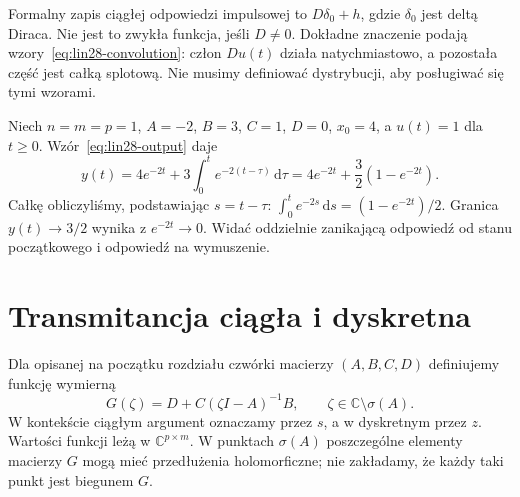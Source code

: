 \begin{uwaga}
\label{rem:lin28-dirac}
Formalny zapis ciągłej odpowiedzi impulsowej
to \(D\delta_0+h\), gdzie \(\delta_0\)
jest deltą Diraca. Nie jest to zwykła funkcja,
jeśli \(D\ne0\). Dokładne znaczenie podają
wzory~\eqref{eq:lin28-convolution}:
człon \(Du(t)\) działa natychmiastowo,
a pozostała część jest całką splotową.
Nie musimy definiować dystrybucji,
aby posługiwać się tymi wzorami.
\end{uwaga}

\begin{przyklad}
\label{prz:lin28-step}
Niech \(n=m=p=1\), \(A=-2\), \(B=3\), \(C=1\),
\(D=0\), \(x_0=4\), a \(u(t)=1\) dla \(t\ge0\).
Wzór~\eqref{eq:lin28-output} daje
\[
 y(t)=4e^{-2t}+3\int_0^t e^{-2(t-\tau)}
 \,\mathrm d\tau
 =4e^{-2t}+\frac32(1-e^{-2t}).
\]
Całkę obliczyliśmy, podstawiając \(s=t-\tau\):
\(\int_0^t e^{-2s}\,\mathrm ds=(1-e^{-2t})/2\).
Granica \(y(t)\to3/2\) wynika z \(e^{-2t}\to0\).
Widać oddzielnie zanikającą odpowiedź od stanu
początkowego i odpowiedź na wymuszenie.
\end{przyklad}

\section{Transmitancja ciągła i dyskretna}
\label{sec:lin28-transfer}

\begin{definicja}
\label{def:lin28-transfer}
Dla opisanej na początku rozdziału
czwórki macierzy \((A,B,C,D)\)
definiujemy funkcję wymierną
\[
 G(\zeta)=D+C(\zeta I-A)^{-1}B,
 \qquad \zeta\in\mathbb C\setminus\sigma(A).
 \tag{28.5}\label{eq:lin28-transfer}
\]
W kontekście ciągłym argument oznaczamy przez \(s\),
a w dyskretnym przez \(z\).
Wartości funkcji leżą w \(\mathbb C^{p\times m}\).
W punktach \(\sigma(A)\) poszczególne elementy
macierzy \(G\) mogą mieć przedłużenia holomorficzne;
nie zakładamy, że każdy taki punkt jest biegunem \(G\).
\end{definicja}

